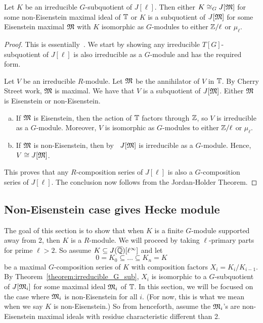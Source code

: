 \documentclass{article}
\begin{document}
\begin{theorem}\label{theorem:irreducible_G_sub}
    Let $K$ be an irreducible $G$-subquotient of $J[\ell]$. Then either $K\cong_G
    J[\mathfrak{M}]$ for some non-Eisenstein maximal ideal of $\mathbb{T}$ or $K$ is a
    subquotient of $J[\mathfrak{M}]$ for some Eisenstein maximal $\mathfrak{M}$ with $K$
    isomorphic as $G$-modules to either $\mathbb{Z}/\ell$ or $\mu_\ell$.
\end{theorem}
\begin{proof}
    This is essentially~\cite[\S 14]{mazur:eisenstein}. We start by showing any
    irreducible $T[G]$-subquotient of $J[\ell]$ is also irreducible as a
    $G$-module and has the required form.

    Let $V$ be an irreducible $R$-module. Let $\mathfrak{M}$ be the annihilator of $V$
    in $\mathbb{T}$. By Cherry Street work, $\mathfrak{M}$ is maximal. We have that $V$ is a
    subquotient of $J[\mathfrak{M}]$. Either $\mathfrak{M}$ is Eisenstein or non-Eisenstein.
    \begin{enumerate}[(a)]
        \item
            If $\mathfrak{M}$ is Eisenstein, then the action of $\mathbb{T}$ factors through
            $\mathbb{Z}$, so $V$ is irreducible as a $G$-module. Moreover, $V$ is
            isomorphic as $G$-modules to either $\mathbb{Z}/\ell$ or $\mu_\ell$.
        \item
            If $\mathfrak{M}$ is non-Eisenstein, then by~\cite[Proposition
            14.2]{mazur:eisenstein} $J[\mathfrak{M}]$ is irreducible as a $G$-module.
            Hence, $V\cong J[\mathfrak{M}]$.
    \end{enumerate}
    This proves that any $R$-composition series of $J[\ell]$ is also a
    $G$-composition series of $J[\ell]$. The conclusion now follows from the
    Jordan-Holder Theorem.
\end{proof} 

\subsection{Non-Eisenstein case gives Hecke module}

The goal of this section is to show that when $K$ is a finite $G$-module
supported away from 2, then $K$ is a $R$-module. We will proceed by taking
$\ell$-primary parts for prime $\ell>2$. So assume $K\subseteq
J(\overline{\mathbb{Q}})[\ell^\infty]$ and let
\[
    0 = K_0 \subseteq \ldots \subseteq K_n = K
\]
be a maximal $G$-composition series of $K$ with composition factors $X_i =
K_i/K_{i-1}$. By Theorem~\ref{theorem:irreducible_G_sub}, $X_i$ is isomorphic
to a $G$-subquotient of $J[\mathfrak{M}_i]$ for some maximal ideal $\mathfrak{M}_i$ of $\mathbb{T}$. In
this section, we will be focused on the case where $\mathfrak{M}_i$ is non-Eisenstein
for all $i$. (For now, this is what we mean when we say $K$ is non-Eisenstein.)
So from henceforth, assume the $\mathfrak{M}_i$'s are non-Eisenstein maximal ideals with
residue characteristic different than 2.
\end{document}
